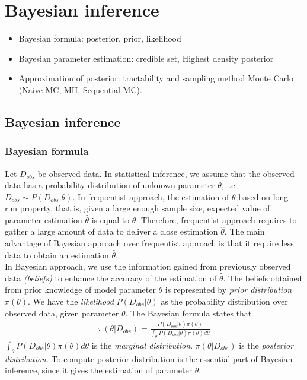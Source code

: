 \chapter{Bayesian inference}
 {\color{red}
  \begin{itemize}
      \item Bayesian formula: posterior, prior, likelihood
      \item Bayesian parameter estimation: credible set, Highest density posterior
      \item Approximation of posterior: tractability and sampling method Monte Carlo (Naive MC, MH, Sequential MC).
  \end{itemize}
 }

\section{Bayesian inference}
\subsection{Bayesian formula}
Let $D_{obs}$ be observed data. In statistical inference, we assume that the observed data has a
probability distribution of unknown parameter $\theta$, i.e $D_{obs} \sim P(D_{obs}|\theta)$. In
frequentist approach, the estimation of $\theta$ based on long-run property, that is, given a large
enough sample size, expected value of parameter estimation $\hat{\theta}$ is equal to $\theta$.
Therefore, frequentist approach requires to gather a large amount of data to deliver a close
estimation $\hat{\theta}$.  The main advantage of Bayesian approach over frequentist approach is
that it require less data to obtain an estimation $\hat{\theta}$.\\
In Bayesian approach, we use the information gained from previously observed data \textit{(beliefs)}
to enhance the accuracy of the estimation of $\hat{\theta}$. The beliefs obtained from prior
knowledge of model parameter $\theta$ is represented by \textit{prior distribution} $\pi(\theta)$.
We have the \textit{likelihood} $P(D_{obs}|\theta)$ as the probability distribution over observed
data, given parameter $\theta$. The Bayesian formula states that
\begin{align*}
    \pi(\theta | D_{obs}) = \frac{P(D_{obs}|\theta)\pi(\theta)}{\int_\theta P(D_{obs}|\theta)\pi(\theta)d\theta}
\end{align*}
$\int_\theta P(D_{obs}|\theta)\pi(\theta)d\theta$ is the \textit{marginal distribution}. $\pi(\theta
    | D_{obs})$ is the \textit{posterior distribution}. To compute posterior distribution is the
essential part of Bayesian inference, since it gives the estimation of parameter $\theta$.

